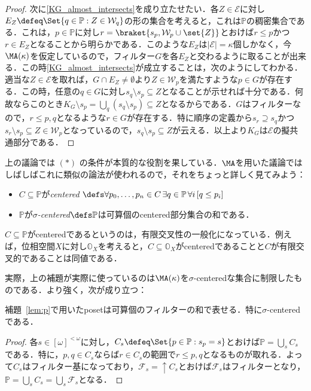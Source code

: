 \documentclass[a4j]{bxjsarticle}
\theoremstyle{definition}
\begin{document}
\begin{proof}
 次に\ref{KG_almost_intersects}を成り立たせたい．各$Z \in \mathcal{E}$に対し$E_Z \defeq \Set{ q \in \mathbb{P} : Z \in \mathcal{W}_q}$の形の集合を考えると，これは$\mathbb{P}$の稠密集合である．これは，$p \in \mathbb{P}$に対し$r = \braket{s_p, \mathcal{W}_p \cup \set{Z}}$とおけば$r \leq p$かつ$r \in E_Z$となることから明らかである．このような$E_Z$は$|\mathcal{E}| = \kappa$個しかなく，今$\MA(\kappa)$を仮定しているので，フィルター$G$を各$E_Z$と交わるように取ることが出来る．この時\ref{KG_almost_intersects}が成立することは，次のようにしてわかる．適当な$Z \in \mathcal{E}$を取れば，$G \cap E_Z \neq \emptyset$より$Z \in \mathcal{W}_p$を満たすような$p \in G$が存在する．この時，任意の$q \in G$に対し$s_q \setminus s_p \subseteq Z$となることが示せれば十分である．何故ならこのとき$K_G \setminus s_p = \bigcup_q (s_q \setminus s_p) \subseteq Z$となるからである．$G$はフィルターなので，$r \leq p, q$となるような$r \in G$が存在する．特に順序の定義から$s_r \supseteq s_q$かつ$s_r \setminus s_p \subseteq Z \in \mathcal{W}_p$となっているので，$s_q \setminus s_p \subseteq Z$が云える．以上より$K_G$は$\mathcal{E}$の擬共通部分である．\mbox{}
\end{proof}

上の議論では $(*)$ の条件が本質的な役割を果している．$\MA$を用いた議論ではしばしばこれに類似の論法が使われるので，それをちょっと詳しく見てみよう：

\begin{definition}
 \begin{itemize}
  \item $C \subseteq \mathbb{P}$が\textit{centered} $\defs \forall p_0, \dots, p_n \in C\, \exists q \in \mathbb{P}\, \forall i\, [q \leq p_i]$
  \item $\mathbb{P}$が\textit{$\sigma$-centered}$\defs \mathbb{P}$は可算個のcentered部分集合の和である．
 \end{itemize}
\end{definition}
$C \subseteq \mathbb{P}$がcenteredであるというのは，有限交叉性の一般化になっている．例えば，位相空間$X$に対し$\mathbb{O}_X$を考えると，$C \subseteq \mathbb{O}_X$がcenteredであることと$C$が有限交叉的であることは同値である．

実際，上の補題が実際に使っているのは$\MA(\kappa)$を$\sigma$-centeredな集合に制限したものである．より強く，次が成り立つ：

\begin{lemma}
 補題~\ref{lem:p}で用いたposetは可算個のフィルターの和で表せる．特に$\sigma$-centeredである．
\end{lemma}
\begin{proof}
 各$s \in [\omega]^{<\omega}$に対し，$C_s \defeq \Set{p \in \mathbb{P} : s_p = s}$とおけば$\mathbb{P} = \bigcup_s C_s$である．特に，$p, q \in C_s$ならば$r \in C_s$の範囲で$r \leq p, q$となるものが取れる．よって$C_s$はフィルター基になっており，$\mathcal{F}_s = \mathop{\uparrow} C_s$とおけば$\mathcal{F}_s$はフィルターとなり，$\mathbb{P} = \bigcup_s C_s = \bigcup_s \mathcal{F}_s$となる．\mbox{}
\end{proof}
\end{document}
